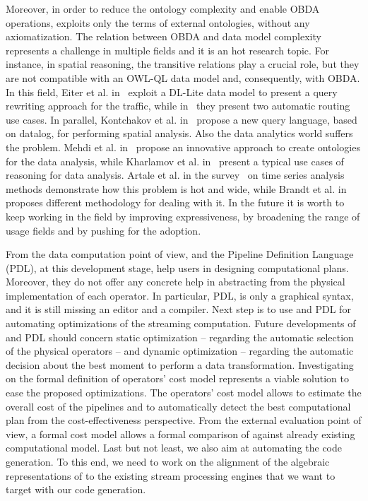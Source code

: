 Moreover, in order to reduce the ontology complexity and enable OBDA operations, \frappe{} exploits only the terms of external ontologies, without any axiomatization.
The relation between OBDA and data model complexity represents a challenge in multiple fields and it is an hot research topic.
For instance, in spatial reasoning, the transitive relations play a crucial role, but they are not compatible with an OWL-QL data model and, consequently, with OBDA.
In this field, Eiter et al. in~\cite{DBLP:conf/esws/EiterPS17} exploit a DL-Lite data model to present a query rewriting approach for the traffic, while in~\cite{DBLP:journals/itsr/EiterKPRSS16} they present two automatic routing use cases. In parallel, Kontchakov et al. in~\cite{DBLP:conf/ijcai/KontchakovPPRZ16} propose a new query language, based on datalog, for performing spatial analysis.
Also the data analytics world suffers the problem. Mehdi et al. in~\cite{DBLP:conf/ijcai/MehdiBRR16} propose an innovative approach to create ontologies for the data analysis, while Kharlamov et al. in~\cite{DBLP:journals/ws/KharlamovMMNORS17} present a typical use cases of reasoning for data analysis.
Artale et al. in the survey~\cite{DBLP:conf/dlog/BienvenuKKPZ16} on time series analysis methods demonstrate how this problem is hot and wide, while Brandt et al. in ~\cite{DBLP:conf/aaai/BrandtKKRXZ17} proposes different methodology for dealing with it.
In the future it is worth to keep working in the field by improving \frappe{} expressiveness, by broadening the range of usage fields and by pushing for the \frappe{} adoption.

From the data computation point of view, \river{} and the Pipeline Definition Language (PDL), at this development stage, help users in designing computational plans.
Moreover, they do not offer any concrete help in abstracting from the physical implementation of each operator.
In particular, PDL, is only a graphical syntax, and it is still missing an editor and a compiler.
Next step is to use \river{} and PDL for automating optimizations of the streaming computation.
Future developments of \river{} and PDL should concern static optimization -- regarding the automatic selection of the physical operators -- and dynamic optimization -- regarding the automatic decision about the best moment to perform a data transformation.
Investigating on the formal definition of operators' cost model represents a viable solution to ease the proposed optimizations.
The operators' cost model allows to estimate the overall cost of the pipelines and to automatically detect the best computational plan from the cost-effectiveness perspective. 
From the external evaluation point of view, a formal cost model allows a formal comparison of \river{} against already existing computational model.
Last but not least, we also aim at automating the code generation.
To this end, we need to work on the alignment of the algebraic representations of \river{} to the existing stream processing engines that we want to target with our code generation.

